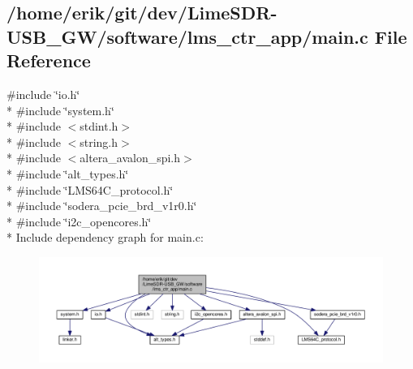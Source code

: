 \subsection{/home/erik/git/dev/\+Lime\+S\+D\+R-\/\+U\+S\+B\+\_\+\+G\+W/software/lms\+\_\+ctr\+\_\+app/main.c File Reference}
\label{main_8c}
{\ttfamily \#include \char`\"{}io.\+h\char`\"{}}\\*
{\ttfamily \#include \char`\"{}system.\+h\char`\"{}}\\*
{\ttfamily \#include $<$stdint.\+h$>$}\\*
{\ttfamily \#include $<$string.\+h$>$}\\*
{\ttfamily \#include $<$altera\+\_\+avalon\+\_\+spi.\+h$>$}\\*
{\ttfamily \#include \char`\"{}alt\+\_\+types.\+h\char`\"{}}\\*
{\ttfamily \#include \char`\"{}L\+M\+S64\+C\+\_\+protocol.\+h\char`\"{}}\\*
{\ttfamily \#include \char`\"{}sodera\+\_\+pcie\+\_\+brd\+\_\+v1r0.\+h\char`\"{}}\\*
{\ttfamily \#include \char`\"{}i2c\+\_\+opencores.\+h\char`\"{}}\\*
Include dependency graph for main.\+c\+:
\nopagebreak
\begin{figure}[H]
\begin{center}
\leavevmode
\includegraphics[width=350pt]{d4/d10/main_8c__incl}
\end{center}
\end{figure}
